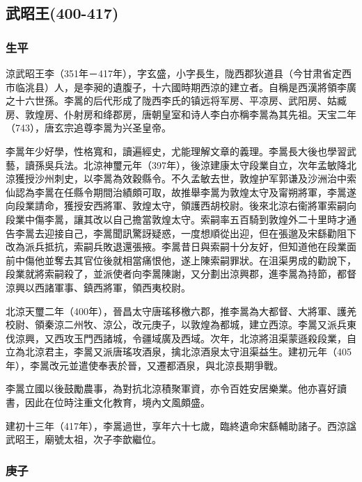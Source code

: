 
\subsection{武昭王\tiny(400-417)}

\subsubsection{生平}

涼武昭王李（351年－417年），字玄盛，小字長生，陇西郡狄道县（今甘肃省定西市临洮县）人，是李昶的遺腹子，十六國時期西涼的建立者。自稱是西漢將領李廣之十六世孫。李暠的后代形成了陇西李氏的镇远将军房、平凉房、武阳房、姑臧房、敦煌房、仆射房和绛郡房，唐朝皇室和诗人李白亦稱李暠為其先祖。天宝二年（743），唐玄宗追尊李暠为兴圣皇帝。

李暠年少好學，性格寬和，讀遍經史，尤能理解文章的義理。李暠長大後也學習武藝，讀孫吳兵法。北涼神璽元年（397年），後涼建康太守段業自立，次年孟敏降北涼獲授沙州刺史，以李暠為效穀縣令。不久孟敏去世，敦煌护军郭谦及沙洲治中索仙認為李暠在任縣令期間治績頗可取，故推舉李暠为敦煌太守及甯朔將軍，李暠遂向段業請命，獲授安西將軍、敦煌太守，領護西胡校尉。後來北涼右衞將軍索嗣向段業中傷李暠，讓其改以自己擔當敦煌太守。索嗣率五百騎到敦煌外二十里時才通告李暠去迎接自己，李暠聞訊驚訝疑惑，一度想順從出迎，但在張邈及宋繇勸阻下改為派兵抵抗，索嗣兵敗退還張掖。李暠昔日與索嗣十分友好，但知道他在段業面前中傷他並奪去其官位後就相當痛恨他，遂上陳索嗣罪狀。在沮渠男成的勸說下，段業就將索嗣殺了，並派使者向李暠陳謝，又分劃出涼興郡，進李暠為持節，都督涼興以西諸軍事、鎮西將軍，領西夷校尉。

北涼天璽二年（400年），晉昌太守唐瑤移檄六郡，推李暠為大都督、大將軍、護羌校尉、領秦涼二州牧、涼公，改元庚子，以敦煌為都城，建立西涼。李暠又派兵東伐涼興，又西攻玉門西諸城，令疆域廣及西域。次年，北涼將沮渠蒙遜殺段業，自立為北涼君主，李暠又派唐瑤攻酒泉，擒北涼酒泉太守沮渠益生。建初元年（405年），李暠改元並遣使奉表於晉，又遷都酒泉，與北涼長期爭戰。

李暠立國以後鼓勵農事，為對抗北涼積聚軍資，亦令百姓安居樂業。他亦喜好讀書，因此在位時注重文化教育，境內文風頗盛。

建初十三年（417年），李暠過世，享年六十七歲，臨終遺命宋繇輔助諸子。西涼諡武昭王，廟號太祖，次子李歆繼位。

\subsubsection{庚子}

